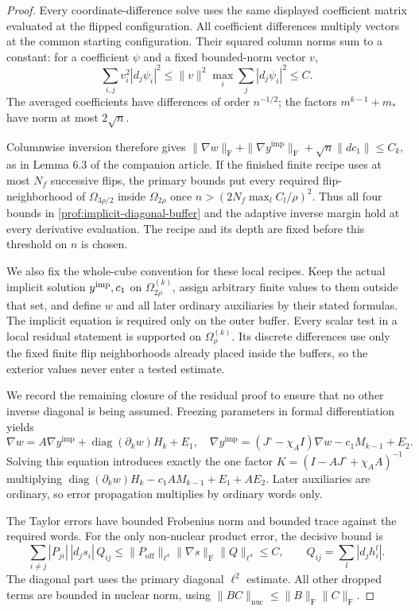 \begin{proof}
Every coordinate-difference solve uses the same displayed coefficient
matrix evaluated at the flipped configuration.  All coefficient
differences multiply vectors at the common starting configuration.
Their squared column norms sum to a constant: for a coefficient $\psi$
and a fixed bounded-norm vector $v$,
\[
 \sum_{i,j}v_i^2|d_j\psi_i|^2
 \le\|v\|^2\max_i\sum_j|d_j\psi_i|^2\le C.
\]
The averaged coefficients have differences of order $n^{-1/2}$;
the factors $m^{k-1}+m_*$ have norm at most $2\sqrt n$.

Columnwise inversion therefore gives
$\|\nabla w\|_{\mathrm F}+\|\nabla y^{\mathrm{imp}}\|_{\mathrm F}
+\sqrt n\|dc_1\|\le C_k$, as in Lemma 6.3 of the companion article.
If the finished finite recipe uses at most $N_f$ successive flips,
the primary bounds put every required flip-neighborhood of
$\Omega_{3\rho/2}$ inside $\Omega_{2\rho}$ once
$n>(2N_f\max_l C_l/\rho)^2$. Thus all four bounds in
\eqref{prof:implicit-diagonal-buffer} and the adaptive inverse margin
hold at every derivative evaluation.  The recipe and its depth are
fixed before this threshold on $n$ is chosen.

We also fix the whole-cube convention for these local recipes.
Keep the actual implicit solution \(y^{\rm imp},c_1\) on
\(\Omega_{2\rho}^{(k)}\), assign arbitrary finite values to them
outside that set, and define \(w\) and all later ordinary
auxiliaries by their stated formulas. The implicit equation is
required only on the outer buffer. Every scalar test in a local
residual statement is supported on \(\Omega_\rho^{(k)}\).
Its discrete differences use only the fixed finite flip
neighborhoods already placed inside the buffers, so the exterior
values never enter a tested estimate.

We record the remaining closure of the residual proof to ensure that
no other inverse diagonal is being assumed.  Freezing parameters in
formal differentiation yields
\[
 \nabla w=A\nabla y^{\mathrm{imp}}+
       \operatorname{diag}(\partial_k w)H_k+E_1,
 \quad
 \nabla y^{\mathrm{imp}}=(J^\circ-\chi_AI)\nabla w-c_1M_{k-1}+E_2.
\]
Solving this equation introduces exactly the one factor
$K=(I-AJ^\circ+\chi_AA)^{-1}$ multiplying
$\operatorname{diag}(\partial_k w)H_k-c_1AM_{k-1}+E_1+AE_2$.
Later auxiliaries are ordinary, so error propagation multiplies by
ordinary words only.

The Taylor errors have bounded Frobenius norm
and bounded trace against the required words.  For the only
non-nuclear product error, the decisive bound is
\[
 \sum_{i\ne j}|P_{ji}|\,|d_js_i|\,Q_{ij}
 \le\|P_{\mathrm{off}}\|_{\ell^4}
       \|\nabla s\|_{\mathrm F}\|Q\|_{\ell^4}\le C,
 \qquad Q_{ij}=\sum_l|d_jh_i^l|.
\]
The diagonal part uses the primary diagonal $\ell^2$ estimate.
All other dropped terms are bounded in nuclear norm, using
$\|BC\|_{\mathrm{nuc}}\le\|B\|_{\mathrm F}\|C\|_{\mathrm F}$.


\end{proof}
